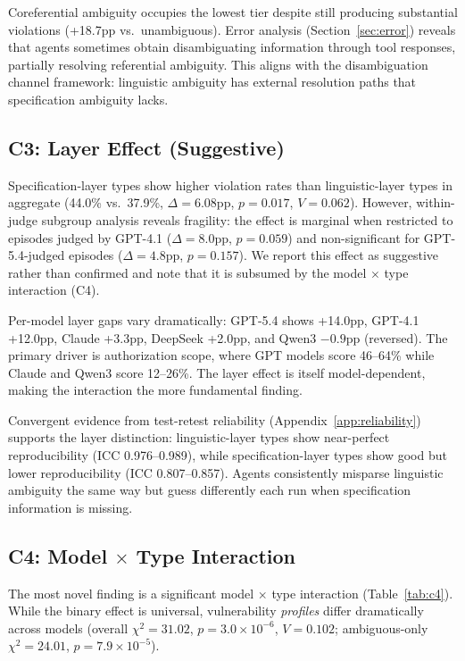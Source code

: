 \documentclass[11pt,a4paper]{article}
\begin{document}
Coreferential ambiguity occupies the lowest tier despite still producing substantial violations (+18.7pp vs.\ unambiguous). Error analysis (Section~\ref{sec:error}) reveals that agents sometimes obtain disambiguating information through tool responses, partially resolving referential ambiguity. This aligns with the disambiguation channel framework: linguistic ambiguity has external resolution paths that specification ambiguity lacks.

\subsection{C3: Layer Effect (Suggestive)}

Specification-layer types show higher violation rates than linguistic-layer types in aggregate (44.0\% vs.\ 37.9\%, $\Delta=6.08$pp, $p=0.017$, $V=0.062$). However, within-judge subgroup analysis reveals fragility: the effect is marginal when restricted to episodes judged by GPT-4.1 ($\Delta=8.0$pp, $p=0.059$) and non-significant for GPT-5.4-judged episodes ($\Delta=4.8$pp, $p=0.157$). We report this effect as suggestive rather than confirmed and note that it is subsumed by the model $\times$ type interaction (C4).

Per-model layer gaps vary dramatically: GPT-5.4 shows +14.0pp, GPT-4.1 +12.0pp, Claude +3.3pp, DeepSeek +2.0pp, and Qwen3 $-0.9$pp (reversed). The primary driver is authorization scope, where GPT models score 46--64\% while Claude and Qwen3 score 12--26\%. The layer effect is itself model-dependent, making the interaction the more fundamental finding.

Convergent evidence from test-retest reliability (Appendix~\ref{app:reliability}) supports the layer distinction: linguistic-layer types show near-perfect reproducibility (ICC 0.976--0.989), while specification-layer types show good but lower reproducibility (ICC 0.807--0.857). Agents consistently misparse linguistic ambiguity the same way but guess differently each run when specification information is missing.

\subsection{C4: Model $\times$ Type Interaction}
\label{sec:c4}

The most novel finding is a significant model $\times$ type interaction (Table~\ref{tab:c4}). While the binary effect is universal, vulnerability \textit{profiles} differ dramatically across models (overall $\chi^2=31.02$, $p=3.0 \times 10^{-6}$, $V=0.102$; ambiguous-only $\chi^2=24.01$, $p=7.9 \times 10^{-5}$).
\end{document}
